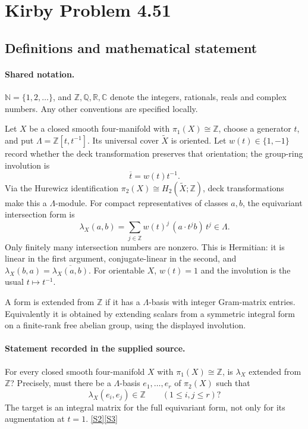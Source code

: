 \documentclass[11pt]{article}
\newcommand{\sref}[2]{\hyperlink{source:#1:#2}{[S#2]}}
\begin{document}
\section{Kirby Problem 4.51}\label{statement}

\subsection{Definitions and mathematical statement}

\paragraph{Shared notation.}$\mathbb N=\{1,2,\ldots\}$, and $\mathbb Z,\mathbb Q,\mathbb R,\mathbb C$ denote the integers, rationals, reals and complex numbers. Any other conventions are specified locally.


Let $X$ be a closed smooth four-manifold with $\pi_1(X)\cong\mathbb Z$, choose a generator $t$, and put $\Lambda=\mathbb Z[t,t^{-1}]$. Its universal cover $\widetilde X$ is oriented. Let $w(t)\in\{1,-1\}$ record whether the deck transformation preserves that orientation; the group-ring involution is
\[
\overline{t}=w(t)t^{-1}.
\]
Via the Hurewicz identification $\pi_2(X)\cong H_2(\widetilde X;\mathbb Z)$, deck transformations make this a $\Lambda$-module. For compact representatives of classes $a,b$, the equivariant intersection form is
\[
\lambda_X(a,b)=\sum_{j\in\mathbb Z}w(t)^j\,(a\cdot t^jb)\,t^j\in\Lambda.
\]
Only finitely many intersection numbers are nonzero. This is Hermitian: it is linear in the first argument, conjugate-linear in the second, and $\lambda_X(b,a)=\overline{\lambda_X(a,b)}$. For orientable $X$, $w(t)=1$ and the involution is the usual $t\mapsto t^{-1}$.

A form is extended from $\mathbb Z$ if it has a $\Lambda$-basis with integer Gram-matrix entries. Equivalently it is obtained by extending scalars from a symmetric integral form on a finite-rank free abelian group, using the displayed involution.
\paragraph{Statement recorded in the supplied source.}
For every closed smooth four-manifold $X$ with $\pi_1(X)\cong\mathbb Z$, is $\lambda_X$ extended from $\mathbb Z$? Precisely, must there be a $\Lambda$-basis $e_1,\ldots,e_r$ of $\pi_2(X)$ such that
\[
\lambda_X(e_i,e_j)\in\mathbb Z\qquad(1\le i,j\le r)?
\]
The target is an integral matrix for the full equivariant form, not only for its augmentation at $t=1$. \sref{statement}{2}\sref{statement}{3}
\end{document}
